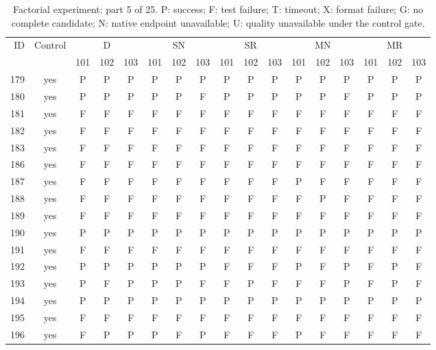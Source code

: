\begin{table}[p]\centering\footnotesize
\setlength{\tabcolsep}{3pt}
\caption{Factorial experiment: part 5 of 25. P: success; F: test failure; T: timeout; X: format failure; G: no complete candidate; N: native endpoint unavailable; U: quality unavailable under the control gate.}
\begin{tabular*}{\textwidth}{@{\extracolsep{\fill}}rcccccccccccccccc}\toprule
ID & Control & \multicolumn{3}{c}{D} & \multicolumn{3}{c}{SN} & \multicolumn{3}{c}{SR} & \multicolumn{3}{c}{MN} & \multicolumn{3}{c}{MR}\\
\cmidrule(lr){3-5}\cmidrule(lr){6-8}\cmidrule(lr){9-11}\cmidrule(lr){12-14}\cmidrule(lr){15-17}
 & & 101 & 102 & 103 & 101 & 102 & 103 & 101 & 102 & 103 & 101 & 102 & 103 & 101 & 102 & 103\\\midrule
179 & yes & P & P & P & P & P & P & P & P & P & P & P & P & P & P & P\\
180 & yes & P & P & P & P & P & F & P & P & P & P & P & F & P & P & P\\
181 & yes & F & F & F & F & F & F & F & F & F & F & F & F & F & F & F\\
182 & yes & F & F & F & F & F & F & F & F & F & F & F & F & F & F & F\\
183 & yes & F & F & F & F & F & F & F & F & F & F & F & F & F & F & F\\
186 & yes & F & F & F & F & F & F & F & F & F & F & F & F & F & F & F\\
187 & yes & F & F & F & F & F & F & F & F & F & P & F & F & F & F & F\\
188 & yes & F & F & F & F & F & F & F & F & F & F & P & F & F & F & F\\
189 & yes & F & F & F & F & F & F & F & F & F & F & F & F & F & F & F\\
190 & yes & P & P & P & P & P & P & P & P & P & P & P & P & P & P & P\\
191 & yes & F & F & F & F & F & F & F & F & F & F & F & F & F & F & F\\
192 & yes & P & P & P & P & P & P & F & F & F & P & F & P & F & P & F\\
193 & yes & P & F & P & P & P & F & F & P & F & F & F & P & F & P & F\\
194 & yes & P & P & P & P & P & P & P & P & P & P & P & P & P & P & P\\
195 & yes & F & F & F & F & F & F & F & F & F & F & F & F & F & F & F\\
196 & yes & F & P & P & P & F & P & F & F & F & P & F & F & F & F & F\\

\end{tabular*}
\end{table}
